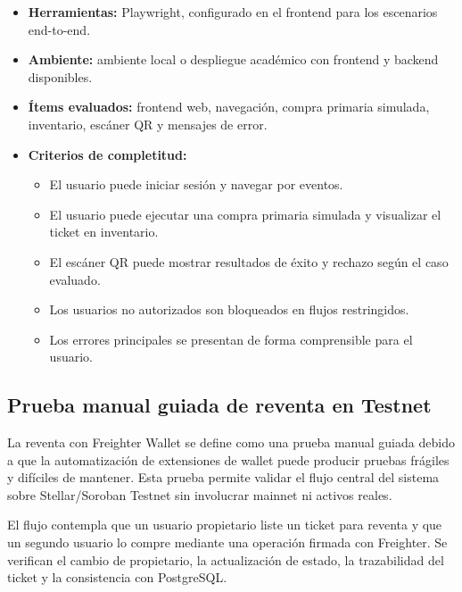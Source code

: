\documentclass[12pt,letterpaper]{article}
\begin{document}
\begin{itemize}
    \item \textbf{Herramientas:} Playwright, configurado en el frontend para los escenarios end-to-end.
    \item \textbf{Ambiente:} ambiente local o despliegue académico con frontend y backend disponibles.
    \item \textbf{Ítems evaluados:} frontend web, navegación, compra primaria simulada, inventario, escáner QR y mensajes de error.
    \item \textbf{Criterios de completitud:}
    \begin{itemize}
        \item El usuario puede iniciar sesión y navegar por eventos.
        \item El usuario puede ejecutar una compra primaria simulada y visualizar el ticket en inventario.
        \item El escáner QR puede mostrar resultados de éxito y rechazo según el caso evaluado.
        \item Los usuarios no autorizados son bloqueados en flujos restringidos.
        \item Los errores principales se presentan de forma comprensible para el usuario.
    \end{itemize}
\end{itemize}

\subsection{Prueba manual guiada de reventa en Testnet}

La reventa con Freighter Wallet se define como una prueba manual guiada debido a que la automatización de extensiones de wallet puede producir pruebas frágiles y difíciles de mantener. Esta prueba permite validar el flujo central del sistema sobre Stellar/Soroban Testnet sin involucrar mainnet ni activos reales.

El flujo contempla que un usuario propietario liste un ticket para reventa y que un segundo usuario lo compre mediante una operación firmada con Freighter. Se verifican el cambio de propietario, la actualización de estado, la trazabilidad del ticket y la consistencia con PostgreSQL.
\end{document}
